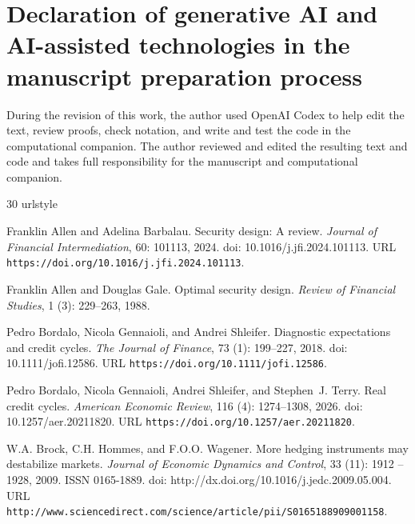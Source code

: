 \documentclass[11pt]{article}
\theoremstyle{plain}
\begin{document}
\section*{Declaration of generative AI and AI-assisted technologies in the manuscript preparation process}

During the revision of this work, the author used OpenAI Codex to help edit the text, review proofs, check notation, and write and test the code in the computational companion. The author reviewed and edited the resulting text and code and takes full responsibility for the manuscript and computational companion.




\begin{thebibliography}{30}
\providecommand{\natexlab}[1]{#1}
\providecommand{\url}[1]{\texttt{#1}}
\expandafter\ifx\csname urlstyle\endcsname\relax
  \providecommand{\doi}[1]{doi: #1}\else
  \providecommand{\doi}{doi: \begingroup \urlstyle{rm}\Url}\fi

Franklin Allen and Adelina Barbalau.
\newblock Security design: A review.
\newblock \emph{Journal of Financial Intermediation}, 60: 101113, 2024.
\newblock \doi{10.1016/j.jfi.2024.101113}.
\newblock URL \url{https://doi.org/10.1016/j.jfi.2024.101113}.

Franklin Allen and Douglas Gale.
\newblock Optimal security design.
\newblock \emph{Review of Financial Studies}, 1 (3):
  229--263, 1988.

Pedro Bordalo, Nicola Gennaioli, and Andrei Shleifer.
\newblock Diagnostic expectations and credit cycles.
\newblock \emph{The Journal of Finance}, 73 (1): 199--227,
  2018.
\newblock \doi{10.1111/jofi.12586}.
\newblock URL \url{https://doi.org/10.1111/jofi.12586}.

Pedro Bordalo, Nicola Gennaioli, Andrei Shleifer, and Stephen~J. Terry.
\newblock Real credit cycles.
\newblock \emph{American Economic Review}, 116 (4):
  1274--1308, 2026.
\newblock \doi{10.1257/aer.20211820}.
\newblock URL \url{https://doi.org/10.1257/aer.20211820}.

W.A. Brock, C.H. Hommes, and F.O.O. Wagener.
\newblock More hedging instruments may destabilize markets.
\newblock \emph{Journal of Economic Dynamics and Control}, 33
  (11): 1912 -- 1928, 2009.
\newblock ISSN 0165-1889.
\newblock \doi{http://dx.doi.org/10.1016/j.jedc.2009.05.004}.
\newblock URL
  \url{http://www.sciencedirect.com/science/article/pii/S0165188909001158}.


\end{thebibliography}
\end{document}
